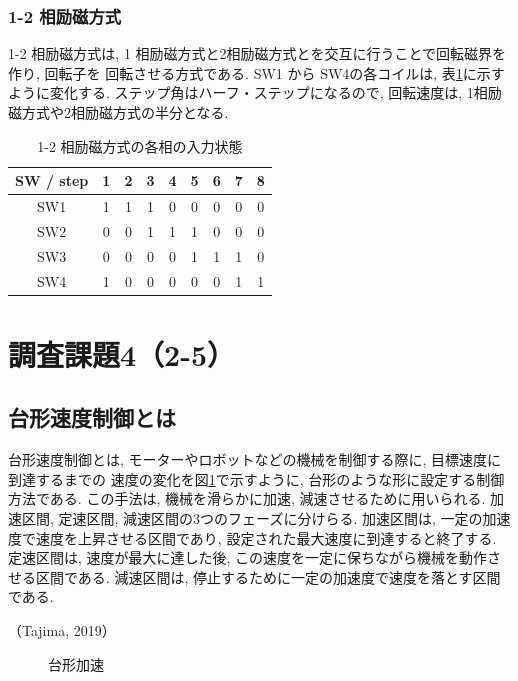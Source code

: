 \documentclass{ltjsarticle} %
\begin{document}
\subsubsection{1-2 相励磁⽅式}
1-2 相励磁⽅式は, 1 相励磁⽅式と2相励磁⽅式とを交互に⾏うことで回転磁界を作り, 回転⼦を
回転させる⽅式である. SW1 から SW4の各コイルは, 表\ref{tab:motor1-2}に示すように変化する. 
ステップ⾓はハーフ・ステップになるので, 回転速度は, 1相励磁⽅式や2相励磁⽅式の半分となる. 

\begin{table}[H] %
  \centering %
  \caption{1-2 相励磁⽅式の各相の入力状態}
  \begin{tabular}{|c|c|c|c|c|c|c|c|c|} 
  \hline %
  SW / step & 1 & 2 & 3 & 4 & 5 & 6 & 7 & 8\\ \hline %
  SW1 & 1 & 1 & 1 & 0 & 0 & 0 & 0 & 0\\ \hline
  SW2 & 0 & 0 & 1 & 1 & 1 & 0 & 0 & 0\\ \hline
  SW3 & 0 & 0 & 0 & 0 & 1 & 1 & 1 & 0\\ \hline
  SW4 & 1 & 0 & 0 & 0 & 0 & 0 & 1 & 1\\ \hline

  \end{tabular}
  \label{tab:motor1-2} %
\end{table}

\section{調査課題4（2-5）}

\subsection{台形速度制御とは}
台形速度制御とは, モーターやロボットなどの機械を制御する際に, 目標速度に到達するまでの
速度の変化を図\ref{fig:graph1}で示すように, 台形のような形に設定する制御方法である. 
この手法は, 機械を滑らかに加速, 減速させるために用いられる. 
加速区間, 定速区間, 減速区間の3つのフェーズに分けらる.  
加速区間は, 一定の加速度で速度を上昇させる区間であり, 設定された最大速度に到達すると終了する. 
定速区間は, 速度が最大に達した後, この速度を一定に保ちながら機械を動作させる区間である. 
減速区間は, 停止するために一定の加速度で速度を落とす区間である. 


（Tajima, 2019）

\begin{figure}[H]
  \centering
  \caption{台形加速}
  \label{fig:graph1}
\end{figure}
\end{document}
